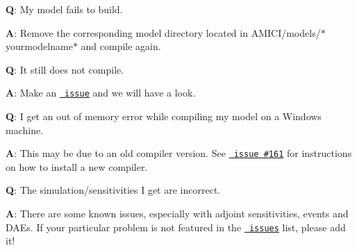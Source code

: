 {\bfseries{Q}}\+: My model fails to build.

{\bfseries{A}}\+: Remove the corresponding model directory located in A\+M\+I\+C\+I/models/$\ast$yourmodelname$\ast$ and compile again.





{\bfseries{Q}}\+: It still does not compile.

{\bfseries{A}}\+: Make an \href{https://github.com/ICB-DCM/AMICI/issues}{\texttt{ issue}} and we will have a look.





{\bfseries{Q}}\+: I get an out of memory error while compiling my model on a Windows machine.

{\bfseries{A}}\+: This may be due to an old compiler version. See \href{https://github.com/ICB-DCM/AMICI/issues/161}{\texttt{ issue \#161}} for instructions on how to install a new compiler.





{\bfseries{Q}}\+: The simulation/sensitivities I get are incorrect.

{\bfseries{A}}\+: There are some known issues, especially with adjoint sensitivities, events and D\+A\+Es. If your particular problem is not featured in the \href{https://github.com/ICB-DCM/AMICI/issues}{\texttt{ issues}} list, please add it! 